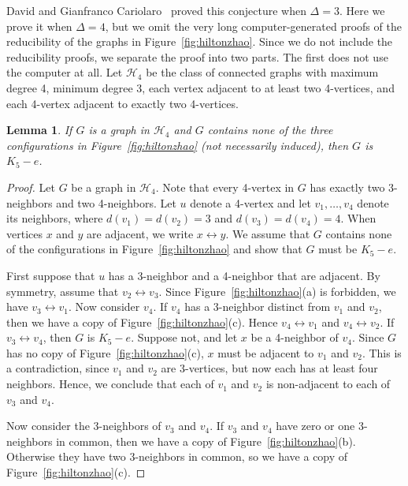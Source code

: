 \documentclass[12pt]{article}
\theoremstyle{plain}
\newtheorem{lem}[thm]{Lemma}
\theoremstyle{definition}
\theoremstyle{remark}
\newcommand{\fancy}[1]{\mathcal{#1}}
\def\adj{\leftrightarrow}
\def\H{\fancy{H}}
\def\adj{\leftrightarrow}
\begin{document}

David and Gianfranco Cariolaro~\cite{cariolaro2003colouring} proved this
conjecture when $\Delta=3$.  Here we prove it when $\Delta=4$, but we
omit the very long computer-generated proofs of the reducibility of the
graphs in Figure~\ref{fig:hiltonzhao}.  
%
Since we do not include the reducibility proofs, we separate the proof into two
parts.  The first does not use the computer at all.
Let $\H_4$ be the class of connected graphs with maximum degree 4, minimum
degree 3, each vertex adjacent to at least two 4-vertices, and each 4-vertex
adjacent to exactly two 4-vertices.
\begin{lem}\label{HiltonZhaoLemma}
If $G$ is a graph in $\H_4$ and $G$ contains none of the three configurations in
Figure~\ref{fig:hiltonzhao} (not necessarily induced), then $G$ is $K_5-e$.
\end{lem}
\begin{proof}
Let $G$ be a graph in $\H_4$.  Note that every 4-vertex in $G$ has exactly two
3-neighbors and two 4-neighbors.  Let $u$ denote a 4-vertex and let
$v_1,\ldots,v_4$ denote its neighbors, where $d(v_1)=d(v_2)=3$ and $d(v_3)=d(v_4)=4$.
When vertices $x$ and $y$ are adjacent, we write $x\adj y$.  We assume that $G$
contains none of the configurations in Figure~\ref{fig:hiltonzhao} and show that
$G$ must be $K_5-e$.  
	
First suppose that $u$ has a 3-neighbor and a 4-neighbor that are adjacent.  By
symmetry, assume that $v_2\adj v_3$.  Since
Figure~\ref{fig:hiltonzhao}(a) is forbidden, we have $v_3\adj v_1$. 
Now consider $v_4$.  If $v_4$ has a 3-neighbor distinct from $v_1$ and $v_2$,
then we have a copy of Figure~\ref{fig:hiltonzhao}(c).  Hence $v_4\adj v_1$ and
$v_4\adj v_2$.  If $v_3\adj v_4$, then $G$ is $K_5-e$.  Suppose not, and let
$x$ be a 4-neighbor of $v_4$.  Since $G$ has no copy of
Figure~\ref{fig:hiltonzhao}(c), $x$ must be adjacent to $v_1$ and $v_2$.  This
is a contradiction, since $v_1$ and $v_2$ are 3-vertices, but now each has at
least four neighbors.  Hence, we conclude that each of $v_1$ and $v_2$ is
non-adjacent to each of $v_3$ and $v_4$.
	
Now consider the 3-neighbors of $v_3$ and $v_4$.  If $v_3$ and $v_4$ have zero 
or one 3-neighbors
in common, then we have a copy of Figure~\ref{fig:hiltonzhao}(b).  
Otherwise they have two 3-neighbors in common,
so we have a copy of Figure~\ref{fig:hiltonzhao}(c).  
\end{proof}
\end{document}
